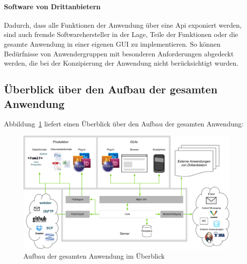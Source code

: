 \paragraph{Software von Drittanbietern} Dadurch, dass alle Funktionen der Anwendung über eine Api exponiert werden, sind auch fremde Softwarehersteller in der Lage, Teile der Funktionen oder die gesamte Anwendung in einer eigenen GUI zu implementieren. So können Bedürfnisse von Anwendergruppen mit besonderen Anforderungen abgedeckt werden, die bei der Konzipierung der Anwendung nicht berücksichtigt wurden.

\pagebreak

\subsection{Überblick über den Aufbau der gesamten Anwendung}

Abbildung~\ref{chart:gesamtessystem} liefert einen Überblick über den Aufbau der gesamten Anwendung:

\begin{figure}[htb]
\begin{center}
\includegraphics[width=\textwidth]{media/GesamtesSystem.pdf}
\caption{Aufbau der gesamten Anwendung im Überblick}
\label{chart:gesamtessystem}
\end{center}
\end{figure}

